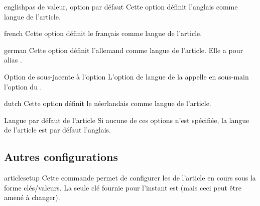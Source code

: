 \documentclass[french,nolocaltoc]{nwejmart}
\newtheorem[title=Fait,style=definition]{fact}
\begin{document}
\begin{docKey}{english}{}{pas de valeur, option par défaut}
  Cette option définit l'anglais comme langue de l'article.
\end{docKey}
\begin{docKey}{french}{}{}
  Cette option définit le français comme langue de l'article.
\end{docKey}
\begin{docKey}{german}{}{}
  Cette option définit l'allemand comme langue de l'article. Elle a pour alias
  .
  \begin{dbremark}{Option de  sous-jacente à l'option
      \protect{}}{}
    L'option de langue  de la \nwejmauthorcl{} appelle en
    sous-main l'option  du .
  \end{dbremark}
  \begin{docKey}{dutch}{}{}
  Cette option définit le néerlandais comme langue de l'article.
\end{docKey}
\end{docKey}

\begin{dbremark}{Langue par défaut de l'article}{}
  Si aucune de ces options n'est spécifiée, la langue de l'article est par
  défaut l'anglais.
\end{dbremark}

\subsection{Autres configurations}
\label{sec:autr-conf}

\begin{docCommand}{articlesetup}{}
  Cette commande permet de configurer les  de l'article en cours
  sous la forme clés/valeurs. La seule clé fournie pour l'instant est
   (mais ceci peut être amené à changer).
\end{docCommand}

\end{document}
